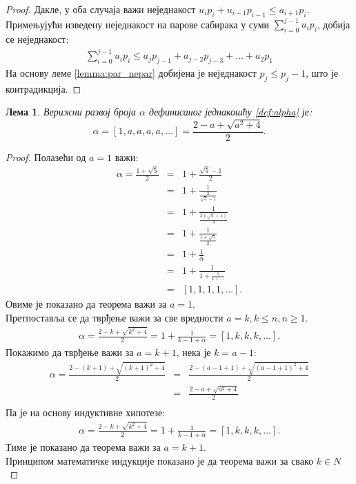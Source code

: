\documentclass[a4paper]{article}
\newtheorem{lemma}{Лема}
\begin{document}
\begin{proof}
	Дакле, у оба случаја важи неједнакост $ u_{i}p_{i}+u_{i-1}p_{i-1} \le a_{i+1}p_{i}$.\\
	Примењујући изведену неједнакост на парове сабирака у суми $ \sum_{i=0}^{j-1} u_{i}p_{i} $, добија се неједнакост:
	\begin{eqnarray*}
		\sum_{i=0}^{j-1} u_{i}p_{i} \leq a_{j}p_{j-1} + a_{j-2}p_{j-3} + \ldots + a_{2}p_{1}
	\end{eqnarray*}
	На основу леме \ref{lemma:par_nepar} добијена је неједнакост $ p_{j} \leq p_{j} - 1 $, што је контрадикција.
	
\end{proof}

\begin{lemma}
	Верижни развој броја $ \alpha $ дефинисаног једнакошћу \eqref{def:alpha} је:
	\begin{displaymath}
	\alpha = [1 ,a, a, a, a, \ldots] = \frac{2 - a + \sqrt{a^2 + 4}}{2}.
	\end{displaymath}  
\end{lemma}

\begin{proof}
	Полазећи од $ a = 1 $ важи:	
		\begin{eqnarray*}
			\alpha = \frac{1+\sqrt 5}{2} &=& 1 + \frac{\sqrt 5 - 1}{2}\\
										 &=& 1 + \frac{1}{\frac{2}{\sqrt 5 - 1}}\\
										 &=& 1 + \frac{1}{\frac{2(\sqrt 5 + 1)}{4}}\\
										 &=& 1 + \frac{1}{\frac{1 + \sqrt 5}{2}}\\
										 &=& 1 + \frac{1}{\alpha}\\
										 &=& 1 + \frac{1}{1 + \frac{1}{1 + \ldots}}\\
										 &=& [1, 1, 1, 1, \ldots].
		\end{eqnarray*}
	Овиме је показано да теорема важи за $ a = 1 $.\\
	Претпоставља се да тврђење важи за све вредности $ a = k, k \leq n, n \geq 1 $. 	
		\begin{eqnarray*}
			\alpha = \frac{2 - k + \sqrt{k^2+4}}{2} = 1 + \frac{1}{k-1+\alpha} = [1, k, k, k, \ldots].
		\end{eqnarray*}
	Покажимо да тврђење важи за $ a = k + 1 $, нека је $ k = a - 1 $:	
		\begin{eqnarray*}
			\alpha = \frac{2 - (k + 1) + \sqrt{(k + 1)^2 + 4}}{2} &=& \frac{2 - (a - 1 + 1) + \sqrt{(a - 1 + 1)^2 + 4}}{2}\\
																  &=& \frac{2 - a + \sqrt{a^2 + 4}}{2}\\
		\end{eqnarray*}
	Па је на основу индуктивне хипотезе:
		\begin{eqnarray*}
			\alpha = \frac{2 - k + \sqrt{k^2+4}}{2} = 1 + \frac{1}{k-1+\alpha} = [1, k, k, k, \ldots].
		\end{eqnarray*}
	Тиме је показано да теорема важи за $ a = k + 1 $. \\	
	Принципом математичке индукције показано је да теорема важи за свако $ k \in N $
\end{proof}
\end{document}
